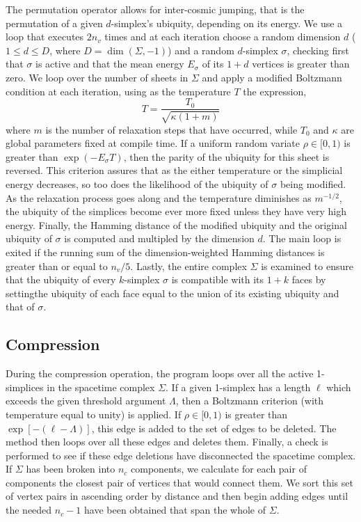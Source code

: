 \documentclass[12pt,letterpaper]{report}
\begin{document}
The permutation operator allows for inter-cosmic jumping, that is the permutation of a given $d$-simplex's 
ubiquity, depending on its energy. We use a loop that executes $2n_v$ times and at each iteration choose 
a random dimension $d$ ($1\le d\le D$, where $D = \dim(\Sigma,-1)$) and a random $d$-simplex $\sigma$, 
checking first that $\sigma$ is active and that the mean energy $E_\sigma$ of its $1+d$ vertices is greater 
than zero. We loop over the number of sheets in $\Sigma$ and apply a modified Boltzmann condition at each 
iteration, using as the temperature $T$ the expression,
\begin{equation*}
T = \frac {T_0}{\sqrt{\kappa (1+m)}}
\end{equation*}
where $m$ is the number of relaxation steps that have occurred, while $T_0$ and $\kappa$ are global 
parameters fixed at compile time. If a uniform random variate $\rho\in [0,1)$ is greater than 
$\exp(-E_\sigma T)$, then the parity of the ubiquity for this sheet is reversed. This criterion 
assures that as the either temperature or the simplicial energy decreases, so too does the likelihood 
of the ubiquity of $\sigma$ being modified. As the relaxation process goes along and the temperature 
diminishes as $m^{-1/2}$, the ubiquity of the simplices become ever more fixed unless they have very 
high energy. Finally, the Hamming distance of the modified ubiquity and the original ubiquity of 
$\sigma$ is computed and multipled by the dimension $d$. The main loop is exited if the running sum 
of the dimension-weighted Hamming distances is greater than or equal to $n_v/5$. Lastly, the entire 
complex $\Sigma$ is examined to ensure that the ubiquity of every $k$-simplex $\sigma$ is compatible 
with its $1+k$ faces by settingthe ubiquity of each face equal to the union of its existing ubiquity 
and that of $\sigma$.  

\subsection{Compression}

During the compression operation, the program loops over all the active 1-simplices in the spacetime 
complex $\Sigma$. If a given 1-simplex has a length $\ell$ which exceeds the given threshold argument 
$\Lambda$, then a Boltzmann criterion (with temperature equal to unity) is applied. If $\rho\in [0,1)$ is 
greater than $\exp[-(\ell - \Lambda)]$, this edge is added to the set of edges to be deleted. The 
method then loops over all these edges and deletes them. Finally, a check is performed to see if these 
edge deletions have disconnected the spacetime complex. If $\Sigma$ has been broken into $n_c$ 
components, we calculate for each pair of components the closest pair of vertices that would connect 
them. We sort this set of vertex pairs in ascending order by distance and then begin adding edges 
until the needed $n_c-1$ have been obtained that span the whole of $\Sigma$.    
\end{document}
